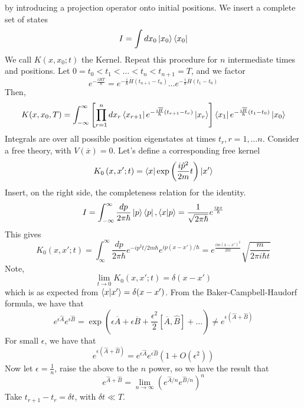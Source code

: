 \documentclass[11pt, oneside]{article}   	%
\theoremstyle{slanted}
\newcommand{\planck}{\hbar}
\begin{document}
by introducing a projection operator 
onto initial positions. 
We insert a complete set of states 
\[
I = \int dx_0 \ket{ x_0 }\bra{ x_0 } 
\] 
We call $ K ( x, x_0; t ) $ the Kernel. 
Repeat this procedure for $ n $ intermediate 
times and positions. 
Let $ 0 = t_0 < t_1 < \dots < t_ n < t _{ n + 1 }  = T $, 
and we factor 
\[
e^{ -\frac{i H T }{ \planck } }  = e ^{  - \frac{i}{\planck } \overline{ H } \left( 
t _{ n +1 }  -  t_ n \right)  } \dots e^{  - \frac{ i }{ \planck } \overline{ H } \left( 
t_1 - t_0 \right)  }
\] Then, 
\[
K ( x, x_0 ,T ) = \int_{  - \infty } ^{ \infty } \left[  
\prod_{ r = 1 }^ n dx _ r \bra{ x_{ r + 1 } } 
e ^{ - \frac{ i \overline{ H } }{ \planck } \left( t _{ r + 1 }  - t_ r  \right)  } 
\ket{ x _ r } \right]  \bra{ x _1} e ^{   - \frac{ i \overline{ H } }{ \planck} \left( 
t_1 - t_0 \right)  }\ket{ x_0 } 
\] Integrals are over all possible 
position eigenstates at times 
$ t_ r , r = 1 , \dots n $. 
Consider a free theory, with $ V ( \overline{ x } ) = 0 $. 
Let's define a corresponding free kernel
\[
K _ 0 \left( x, x' ; t  \right)  = \bra{ x }\exp\left( \frac{i \hat{p }^ 2   }{2m }t \right)
\ket{ x' } 
\]  Insert, on the right side, the completeness relation 
for the identity. 
\[
I  = \int_{  - \infty }^{ \infty } \frac{ dp }{ 2 \pi \planck } \ket{ p }\bra{ p }, 
\bra{ x }\ket{ p }  = \frac{1}{ \sqrt{ 2 \pi \planck }  } e ^{ \frac{ i p x }{ \planck }}
\] This gives 
\[
K_0 \left( x, x ' ; t  \right)   = 
\int_{ \infty } ^{ \infty } \frac{ dp }{ 2 \pi \planck } e ^{  - i p ^ 2 t / 
2m \planck  } e ^{ i p ( x - x ') / \planck}  = 
e ^{ \frac{ im ( x - x ' ) ^ 2 }{ 2 \planck t } } \sqrt{ \frac{ m }{ 2 \pi i 
\planck t}} 
\] Note, 
\[
\lim_{ t \to 0 } K_ 0 \left( x, x ' ; t  \right)   =\delta ( x   - x ' ) 
\] which is as expected from $ \bra{ x }\ket{ x ' }  = \delta ( x   - x ' ) $. 
From the Baker-Campbell-Haudorf formula, 
we have that 
\[
e ^{ \epsilon \hat{A } }e^{ \epsilon \hat{B } } = 
\exp\left( \epsilon \overline{ A } + \epsilon \overline{ B }  + \frac{ \epsilon ^ 2 }{2 } 
\left[  \overline{ A}, \hat{ B } \right] + \dots \right) \neq e ^{ \epsilon \left( 
\hat{ A } + \hat{ B }\right) } 
\] For small $ \epsilon $, we have that 
\[
e ^{ \epsilon ( \hat{ A  } + \hat{ B } ) } = e^{ \epsilon \hat{ A   } }e ^{ \epsilon \hat{ B } } \left(  1 + O ( \epsilon ^ 2 )  \right)
\] Now let $ \epsilon = \frac{1}{n } $, raise the above to the $ n $ power, 
so we have the result that 
\[
e ^{ \hat{ A } + \hat{ B }  } = \lim_{ n \to \infty } \left( 
e ^{ \hat{ A } / n } e ^{ \hat{B } / n  }\right) ^ n 
\] Take $ t _{  r + 1 }  - t_ r  = \delta t $, with $ \delta t \ll T $. 
\end{document}
